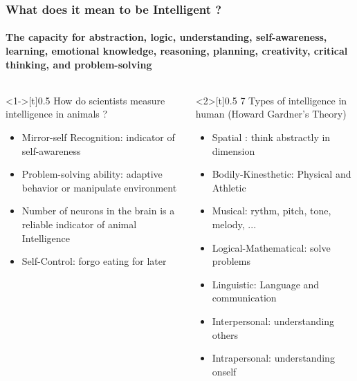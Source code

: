\documentclass{beamer}
\begin{document}
\begin{frame}
  \frametitle{What does it mean to be Intelligent ?}
  \framesubtitle{The capacity for abstraction, logic, understanding, self-awareness, learning, emotional knowledge, reasoning, planning, creativity, critical thinking, and problem-solving}

  \begin{columns}
    \begin{column}<1->[t]{0.5\textwidth}
      How do scientists measure intelligence in animals ?
    \begin{itemize}
      \item Mirror-self Recognition: indicator of self-awareness
      \item Problem-solving ability: adaptive behavior or manipulate environment
      \item Number of neurons in the brain is a reliable indicator of animal Intelligence
      \item Self-Control: forgo eating for later
    \end{itemize}
    \end{column}

    \begin{column}<2>[t]{0.5\textwidth}
      7 Types of intelligence in human (Howard Gardner's Theory)
      \begin{itemize}
        \item Spatial : think abstractly in dimension
        \item Bodily-Kinesthetic: Physical and Athletic
        \item Musical: rythm, pitch, tone, melody, ...
        \item Logical-Mathematical: solve problems
        \item Linguistic: Language and communication
        \item Interpersonal: understanding others
        \item Intrapersonal: understanding onself
        
      \end{itemize}
      
    \end{column}
  \end{columns}
\end{frame}
\end{document}
